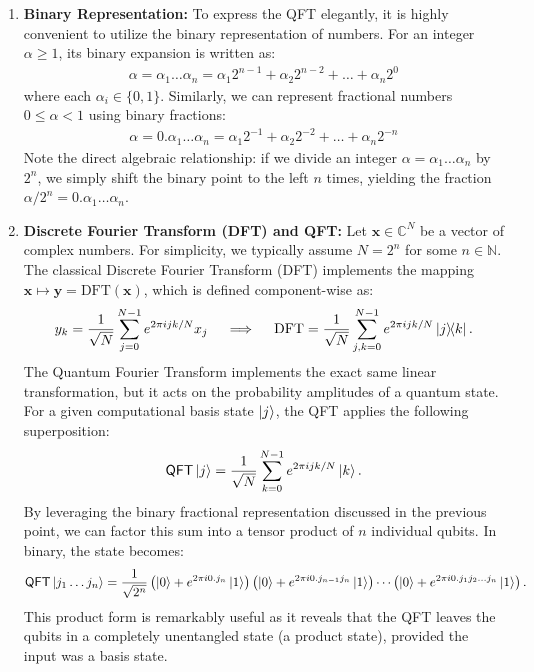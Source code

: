\begin{enumerate}
    \item \textbf{Binary Representation:} 
    To express the QFT elegantly, it is highly convenient to utilize the binary representation of numbers. For an integer $\alpha \geq 1$, its binary expansion is written as:
    \begin{align*}
        \alpha = \alpha_1\dots\alpha_n = \alpha_1 2^{n-1} + \alpha_2 2^{n-2} + \dots + \alpha_n 2^0
    \end{align*}
    where each $\alpha_i \in \{0, 1\}$. 
    Similarly, we can represent fractional numbers $0 \leq \alpha < 1$ using binary fractions:
    \begin{align*}
        \alpha = 0.\alpha_1\dots\alpha_n = \alpha_1 2^{-1} + \alpha_2 2^{-2} + \dots + \alpha_n 2^{-n}
    \end{align*}
    Note the direct algebraic relationship: if we divide an integer $\alpha = \alpha_1\dots\alpha_n$ by $2^n$, we simply shift the binary point to the left $n$ times, yielding the fraction $\alpha/2^n = 0.\alpha_1\dots\alpha_n$.

    \item \textbf{Discrete Fourier Transform (DFT) and QFT:}
    Let $\mathbf{x}\in \mathbb{C}^N$ be a vector of complex numbers. For simplicity, we typically assume $N=2^n$ for some $n \in \mathbb{N}$. The classical Discrete Fourier Transform (DFT) implements the mapping $\mathbf{x} \mapsto \mathbf{y} = \text{DFT}(\mathbf{x})$, which is defined component-wise as:
    \begin{align*}
        y_k = \frac{1}{\sqrt{N}} \sum_{j=0}^{N-1} e^{2\pi ijk/N} x_j \quad \implies \quad \text{DFT} = \frac{1}{\sqrt{N}} \sum_{j,k=0}^{N-1} e^{2\pi ijk/N} \ketbra{j}{k}.
    \end{align*}
    The Quantum Fourier Transform implements the exact same linear transformation, but it acts on the probability amplitudes of a quantum state. For a given computational basis state $\ket{j}$, the QFT applies the following superposition:
    \begin{align*}
        \mathsf{QFT}\ket{j} = \frac{1}{\sqrt{N}} \sum_{k=0}^{N-1} e^{2\pi ijk/N} \ket{k}.
    \end{align*}
    By leveraging the binary fractional representation discussed in the previous point, we can factor this sum into a tensor product of $n$ individual qubits. In binary, the state becomes:
    \begin{align*}
        \mathsf{QFT}\ket{j_1\dots j_n} = \frac{1}{\sqrt{2^n}}\left( \ket{0}+e^{2\pi i0.j_n}\ket{1} \right)\left( \ket{0}+e^{2\pi i0.j_{n-1}j_n}\ket{1} \right)\cdots \left( \ket{0}+e^{2\pi i0.j_1j_2\dots j_n}\ket{1}\right).
    \end{align*}
    This product form is remarkably useful as it reveals that the QFT leaves the qubits in a completely unentangled state (a product state), provided the input was a basis state.


\end{enumerate}
